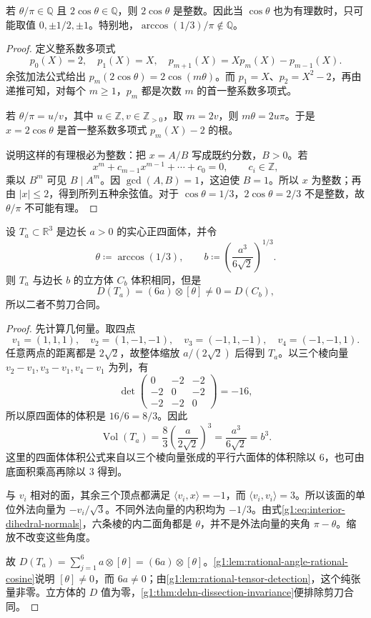 \begin{lemma}
	\label{g1:lem:rational-angle-rational-cosine}
	若 \(\theta/\pi\in\mathbb Q\) 且 \(2\cos\theta\in\mathbb Q\)，则 \(2\cos\theta\) 是整数。因此当 \(\cos\theta\) 也为有理数时，只可能取值 \(0,\pm1/2,\pm1\)。特别地，\(\arccos(1/3)/\pi\notin\mathbb Q\)。
\end{lemma}
\begin{proof}
	定义整系数多项式
	\[
		p_0(X)=2,\quad p_1(X)=X,\quad
		p_{m+1}(X)=Xp_m(X)-p_{m-1}(X).
	\]
	余弦加法公式给出 \(p_m(2\cos\theta)=2\cos(m\theta)\)。而 \(p_1=X\)、\(p_2=X^2-2\)，再由递推可知，对每个 \(m\ge1\)，\(p_m\) 都是次数 \(m\) 的首一整系数多项式。

	若 \(\theta/\pi=u/v\)，其中 \(u\in\mathbb Z,v\in\mathbb Z_{>0}\)，取 \(m=2v\)，则 \(m\theta=2u\pi\)。于是 \(x=2\cos\theta\) 是首一整系数多项式 \(p_m(X)-2\) 的根。

	说明这样的有理根必为整数：把 \(x=A/B\) 写成既约分数，\(B>0\)。若
	\[
		x^m+c_{m-1}x^{m-1}+\cdots+c_0=0,
		\qquad c_i\in\mathbb Z,
	\]
	乘以 \(B^m\) 可见 \(B\mid A^m\)。因 \(\gcd(A,B)=1\)，这迫使 \(B=1\)。所以 \(x\) 为整数；再由 \(|x|\le2\)，得到所列五种余弦值。对于 \(\cos\theta=1/3\)，\(2\cos\theta=2/3\) 不是整数，故 \(\theta/\pi\) 不可能有理。
\end{proof}

\begin{theorem}
	\label{g1:thm:cube-regular-tetrahedron-scissors}
	设 \(T_a\subset\mathbb R^3\) 是边长 \(a>0\) 的实心正四面体，并令
	\[
		\theta\coloneqq\arccos(1/3),\qquad
		b\coloneqq\left(\frac{a^3}{6\sqrt2}\right)^{1/3}.
	\]
	则 \(T_a\) 与边长 \(b\) 的立方体 \(C_b\) 体积相同，但是
	\[
		D(T_a)=(6a)\otimes[\theta]\ne0=D(C_b),
	\]
	所以二者不剪刀合同。
\end{theorem}
\begin{proof}
	先计算几何量。取四点
	\[
		v_1=(1,1,1),\quad v_2=(1,-1,-1),\quad
		v_3=(-1,1,-1),\quad v_4=(-1,-1,1).
	\]
	任意两点的距离都是 \(2\sqrt2\)，故整体缩放 \(a/(2\sqrt2)\) 后得到 \(T_a\)。以三个棱向量 \(v_2-v_1,v_3-v_1,v_4-v_1\) 为列，有
	\[
		\det\begin{pmatrix}0&-2&-2\\-2&0&-2\\-2&-2&0\end{pmatrix}=-16,
	\]
	所以原四面体的体积是 \(16/6=8/3\)。因此
	\[
		\operatorname{Vol}(T_a)
		=\frac83\left(\frac{a}{2\sqrt2}\right)^3
		=\frac{a^3}{6\sqrt2}=b^3.
	\]
	这里的四面体体积公式来自以三个棱向量张成的平行六面体的体积除以 \(6\)，也可由底面积乘高再除以 \(3\) 得到。

	与 \(v_i\) 相对的面，其余三个顶点都满足 \(\langle v_i,x\rangle=-1\)，而 \(\langle v_i,v_i\rangle=3\)。所以该面的单位外法向量为 \(-v_i/\sqrt3\)。不同外法向量的内积均为 \(-1/3\)。由式\eqref{g1:eq:interior-dihedral-normals}，六条棱的内二面角都是 \(\theta\)，并不是外法向量的夹角 \(\pi-\theta\)。缩放不改变这些角度。

	故 \(D(T_a)=\sum_{j=1}^{6}a\otimes[\theta]=(6a)\otimes[\theta]\)。\cref{g1:lem:rational-angle-rational-cosine}说明 \([\theta]\ne0\)，而 \(6a\ne0\)；由\cref{g1:lem:rational-tensor-detection}，这个纯张量非零。立方体的 \(D\) 值为零，\cref{g1:thm:dehn-dissection-invariance}便排除剪刀合同。
\end{proof}

